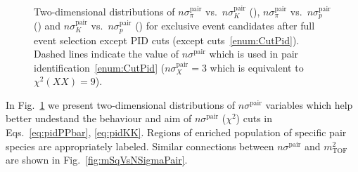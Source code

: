 \begin{figure}[h]
{  \begin{subfigure}[b]{\linewidth}\addtocounter{subfigure}{-2}\vspace*{-13pt}
  \end{subfigure}\\
  \begin{minipage}[t][1.042\linewidth][t]{\linewidth}\vspace{10pt}
    \caption[$n\sigma^{\text{pair}}_{X}$ vs. $n\sigma^{\text{pair}}_{Y}$.]{Two-dimensional distributions of $n\sigma^{\text{pair}}_{\pi}$ vs.~$n\sigma^{\text{pair}}_{K}$ (), $n\sigma^{\text{pair}}_{\pi}$ vs.~$n\sigma^{\text{pair}}_{p}$  () and $n\sigma^{\text{pair}}_{K}$ vs.~$n\sigma^{\text{pair}}_{p}$  () for exclusive event candidates after full event selection except PID cuts (except cuts~\ref{enum:CutPid}). Dashed lines indicate the value of $n\sigma^{\text{pair}}$ which is used in pair identification~\ref{enum:CutPid} ($n\sigma^{\text{pair}}_{X}=3$ which is equivalent to $\chi^{2}(XX)=9$).}\label{fig:SqRootNSigma2D}
  \end{minipage}
}%

\end{figure}


In Fig.~\ref{fig:SqRootNSigma2D} we present two-dimensional distributions of $n\sigma^{\text{pair}}$ variables which help better undestand the behaviour and aim of $n\sigma^{\text{pair}}$ ($\chi^{2}$) cuts in Eqs.~\eqref{eq:pidPPbar}, \eqref{eq:pidKK}. Regions of enriched population of specific pair species are appropriately labeled. Similar connections between $n\sigma^{\text{pair}}$ and $m^{2}_{\text{TOF}}$ are shown in Fig.~\ref{fig:mSqVsNSigmaPair}.
 

